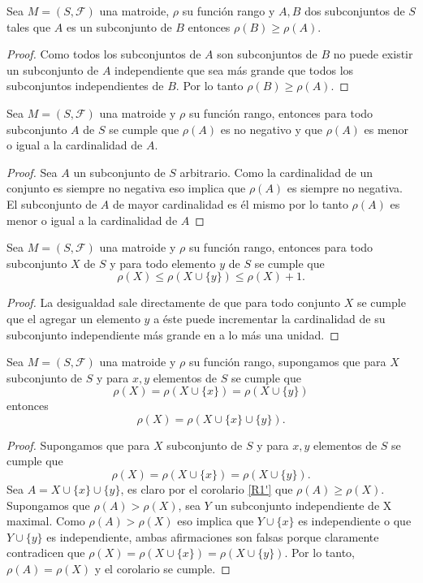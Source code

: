 \begin{cor}\label{R2'}
Sea $M=(S,\mathcal{F})$ una matroide, $\rho$ su función rango y $A,B$ dos subconjuntos de $S$ tales que $A$ es un subconjunto de $B$ entonces $\rho(B) \geq \rho(A)$.
\end{cor}
\begin{proof}
Como todos los subconjuntos de $A$ son subconjuntos de $B$ no puede existir un subconjunto de $A$ independiente que sea más grande que todos los subconjuntos independientes de $B$. Por lo tanto $\rho(B) \geq \rho(A)$.
\end{proof}

\begin{cor} \label{R1'}
Sea $M=(S,\mathcal{F})$ una matroide y $\rho$ su función rango, entonces para todo subconjunto $A$ de $S$ se cumple que $\rho (A)$ es no negativo y que $\rho(A)$ es menor o igual a la cardinalidad de $A$.
\end{cor}

\begin{proof}
Sea $A$ un subconjunto de $S$ arbitrario. 
Como la cardinalidad de un conjunto es siempre no negativa eso implica que $\rho(A)$ es siempre no negativa. El subconjunto de $A$ de mayor cardinalidad es él mismo por lo tanto $\rho(A)$ es menor o igual a la cardinalidad de $A$
\end{proof}

\begin{cor} \label{R2}
Sea $M=(S,\mathcal{F})$ una matroide y $\rho$ su función rango, entonces para todo subconjunto $X$ de $S$ y para todo elemento $y$ de $S$ se cumple que
$$\rho(X) \leq \rho(X \cup \{y\}) \leq \rho(X)+1.$$
\end{cor} 

\begin{proof}
La desigualdad sale directamente de que para todo conjunto $X$ se cumple que el agregar un elemento $y$ a éste puede incrementar la cardinalidad de su subconjunto independiente más grande en a lo más una unidad.
\end{proof}

\begin{cor} \label{R3}
Sea $M=(S,\mathcal{F})$ una matroide y $\rho$ su función rango, supongamos que para $X$ subconjunto de $S$ y para $x,y$ elementos de $S$ se cumple que 
$$\rho(X)=\rho(X \cup \{ x\}) =\rho(X \cup \{ y\}) $$ 
entonces 
$$\rho(X)=\rho(X \cup \{ x\} \cup \{ y\}).$$
\end{cor}

\begin{proof}
Supongamos que para $X$ subconjunto de $S$ y para $x,y$ elementos de $S$ se cumple que 
$$\rho(X)=\rho(X \cup \{ x\}) =\rho(X \cup \{ y\}). $$ 
Sea $A = X \cup \{ x\} \cup \{ y\}$, es claro por el corolario \ref{R1'} que $\rho(A) \geq \rho(X)$. Supongamos que $\rho(A) > \rho(X)$, sea $Y$ un subconjunto independiente de X maximal. Como $\rho(A) > \rho(X)$ eso implica que $Y \cup \{x\}$ es independiente o que $Y \cup \{y\}$ es independiente, ambas afirmaciones son falsas porque claramente contradicen que $\rho(X)=\rho(X \cup \{ x\}) =\rho(X \cup \{ y\})$. Por lo tanto, $\rho(A) = \rho(X)$ y el corolario se cumple. 
\end{proof}

